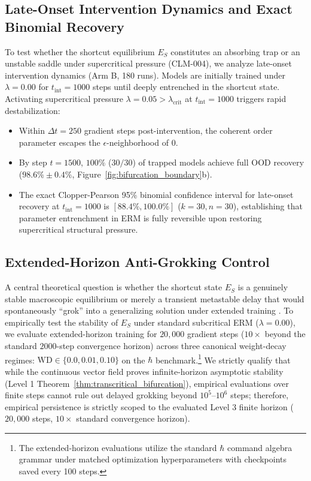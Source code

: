 \documentclass{article}
\theoremstyle{plain}
\theoremstyle{definition}
\begin{document}
\subsection{Late-Onset Intervention Dynamics and Exact Binomial Recovery}
To test whether the shortcut equilibrium $E_S$ constitutes an absorbing trap or an unstable saddle under supercritical pressure (CLM-004), we analyze late-onset intervention dynamics (Arm B, 180 runs). Models are initially trained under $\lambda = 0.00$ for $t_{\text{int}} = 1000$ steps until deeply entrenched in the shortcut state. Activating supercritical pressure $\lambda = 0.05 > \lambda_{\text{crit}}$ at $t_{\text{int}} = 1000$ triggers rapid destabilization:
\begin{itemize}[noitemsep]
    \item Within $\Delta t = 250$ gradient steps post-intervention, the coherent order parameter escapes the $\epsilon$-neighborhood of 0.
    \item By step $t = 1500$, $100\%$ ($30/30$) of trapped models achieve full OOD recovery ($98.6\% \pm 0.4\%$, Figure~\ref{fig:bifurcation_boundary}b).
    \item The exact Clopper-Pearson 95\% binomial confidence interval for late-onset recovery at $t_{\text{int}} = 1000$ is $[88.4\%, 100.0\%]$ ($k=30, n=30$), establishing that parameter entrenchment in ERM is fully reversible upon restoring supercritical structural pressure.
\end{itemize}

\subsection{Extended-Horizon Anti-Grokking Control}
\label{sec:extended_horizon_grokking}
A central theoretical question is whether the shortcut state $E_S$ is a genuinely stable macroscopic equilibrium or merely a transient metastable delay that would spontaneously ``grok'' into a generalizing solution under extended training \citep{Power2022Grokking,Liu2022Grokking,Varma2023Explaining}. To empirically test the stability of $E_S$ under standard subcritical ERM ($\lambda = 0.00$), we evaluate extended-horizon training for $20{,}000$ gradient steps ($10\times$ beyond the standard $2000$-step convergence horizon) across three canonical weight-decay regimes: $\text{WD} \in \{0.0, 0.01, 0.10\}$ on the $\hbar$ benchmark.\footnote{The extended-horizon evaluations utilize the standard $\hbar$ command algebra grammar under matched optimization hyperparameters with checkpoints saved every 100 steps.} We strictly qualify that while the continuous vector field proves infinite-horizon asymptotic stability (Level 1 Theorem~\ref{thm:transcritical_bifurcation}), empirical evaluations over finite steps cannot rule out delayed grokking beyond $10^5$--$10^6$ steps; therefore, empirical persistence is strictly scoped to the evaluated Level 3 finite horizon ($20{,}000$ steps, $10\times$ standard convergence horizon).
\end{document}
